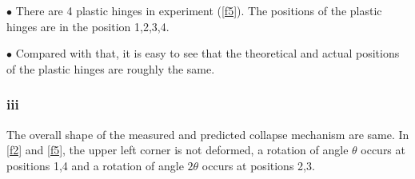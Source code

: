 $\bullet$ There are 4 plastic hinges in experiment (\autoref{f5}). The positions of the plastic hinges are in the position 1,2,3,4.

$\bullet$ Compared with that, it is easy to see that the theoretical and actual positions of the plastic hinges are roughly the same.

\subsubsection*{iii}

The overall shape of the measured and predicted collapse mechanism are same. In \autoref{f2} and \autoref{f5}, the upper left corner is not deformed, a rotation of angle $\theta$ occurs at positions 1,4 and a rotation of angle $2\theta$ occurs at positions 2,3.
\fi